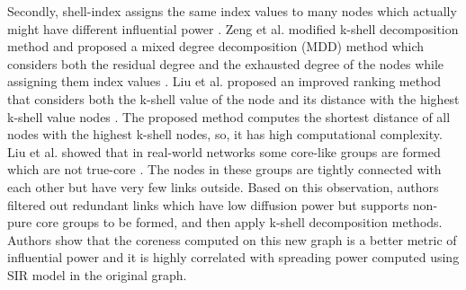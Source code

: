 \documentclass[12pt,3p]{article}
\begin{document}
Secondly, shell-index assigns the same index values to many nodes which actually might have different influential power \cite{zareie2018hierarchical, wang2016fast, zeng2013ranking}. Zeng et al. modified k-shell decomposition method and proposed a mixed degree decomposition (MDD) method which considers both the residual degree and the exhausted degree of the nodes while assigning them index values \cite{zeng2013ranking}. Liu et al. proposed an improved ranking method that considers both the k-shell value of the node and its distance with the highest k-shell value nodes \cite{liu2013ranking}. The proposed method computes the shortest distance of all nodes with the highest k-shell nodes, so, it has high computational complexity. Liu et al. showed that in real-world networks some core-like groups are formed which are not true-core \cite{liu2015improving}. The nodes in these groups are tightly connected with each other but have very few links outside. Based on this observation, authors filtered out redundant links which have low diffusion power but supports non-pure core groups to be formed, and then apply k-shell decomposition methods. Authors show that the coreness computed on this new graph is a better metric of influential power and it is highly correlated with spreading power computed using SIR model in the original graph. 
\end{document}
